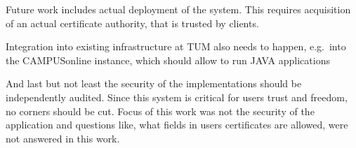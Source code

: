 Future work includes actual deployment of the system.
This requires acquisition of an actual certificate authority, that is trusted by clients.

Integration into existing infrastructure at TUM also needs to happen, e.g.\ into the CAMPUSonline instance, which should
allow to run JAVA applications

And last but not least the security of the implementations should be independently audited.
Since this system is critical for users trust and freedom, no corners should be cut.
Focus of this work was not the security of the application and questions like, what fields in users certificates are
allowed, were not answered in this work.

\pagestyle{thesischapter}
\cleardoublepage
{}
\printbibliography[heading=bibintoc]
